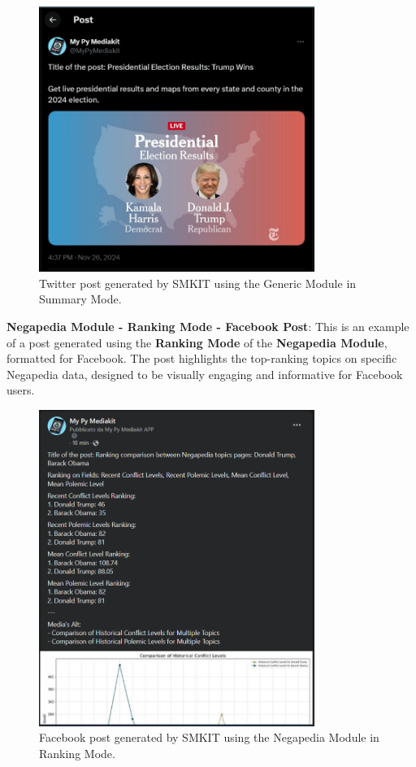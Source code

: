 \begin{figure}[H]
    \centering
    \includegraphics[width=0.8\textwidth]{figures/results/generic_module/summary_mode/twitter/twitter_generic_summary_post_screenshot.png}
    \caption{Twitter post generated by SMKIT using the Generic Module in Summary Mode.}
    \label{fig:twitter_generic_summary_post_screenshot}
\end{figure}

\textbf{Negapedia Module - Ranking Mode - Facebook Post}:  
This is an example of a post generated using the \textbf{Ranking Mode} of the \textbf{Negapedia Module}, formatted for Facebook. The post highlights the top-ranking topics on specific Negapedia data, designed to be visually engaging and informative for Facebook users.

\begin{figure}[H]
    \centering
    \includegraphics[width=0.8\textwidth]{figures/results/negapedia_module/ranking_mode/facebook/facebook_negapedia_ranking_post_screenshot.png}
    \caption{Facebook post generated by SMKIT using the Negapedia Module in Ranking Mode.}
    \label{fig:facebook_negapedia_ranking_post_screenshot}
\end{figure}

